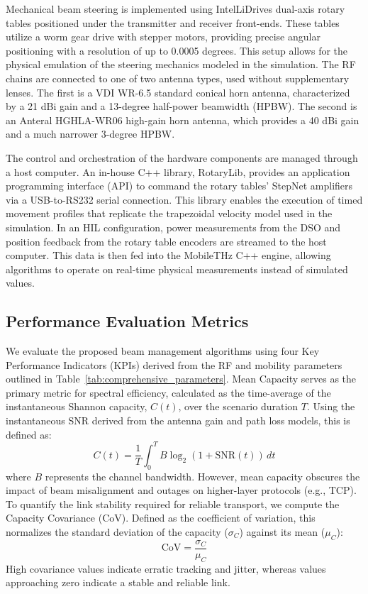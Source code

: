 \documentclass[fleqn,10pt]{wlscirep}
\begin{document}
Mechanical beam steering is implemented using IntelLiDrives dual-axis rotary tables positioned under the transmitter and receiver front-ends. These tables utilize a worm gear drive with stepper motors, providing precise angular positioning with a resolution of up to 0.0005 degrees. This setup allows for the physical emulation of the steering mechanics modeled in the simulation. The RF chains are connected to one of two antenna types, used without supplementary lenses. The first is a VDI WR-6.5 standard conical horn antenna, characterized by a 21 dBi gain and a 13-degree half-power beamwidth (HPBW). The second is an Anteral HGHLA-WR06 high-gain horn antenna, which provides a 40 dBi gain and a much narrower 3-degree HPBW.

The control and orchestration of the hardware components are managed through a host computer. An in-house C++ library, RotaryLib, provides an application programming interface (API) to command the rotary tables' StepNet amplifiers via a USB-to-RS232 serial connection. This library enables the execution of timed movement profiles that replicate the trapezoidal velocity model used in the simulation. In an HIL configuration, power measurements from the DSO and position feedback from the rotary table encoders are streamed to the host computer. This data is then fed into the MobileTHz C++ engine, allowing algorithms to operate on real-time physical measurements instead of simulated values.


\subsection*{Performance Evaluation Metrics}
We evaluate the proposed beam management algorithms using four Key Performance Indicators (KPIs) derived from the RF and mobility parameters outlined in Table~\ref{tab:comprehensive_parameters}. Mean Capacity  serves as the primary metric for spectral efficiency, calculated as the time-average of the instantaneous Shannon capacity, $C(t)$, over the scenario duration $T$. Using the instantaneous SNR derived from the antenna gain and path loss models, this is defined as:
\begin{equation}
    {C(t)} = \frac{1}{T} \int_{0}^{T} B \log_2(1 + \text{SNR}(t)) \, dt
\end{equation}
where $B$ represents the channel bandwidth. However, mean capacity obscures the impact of beam misalignment and outages on higher-layer protocols (e.g., TCP). To quantify the link stability required for reliable transport, we compute the Capacity Covariance (CoV). Defined as the coefficient of variation, this normalizes the standard deviation of the capacity ($\sigma_C$) against its mean ($\mu_C$):
\begin{equation}
    \text{CoV} = \frac{\sigma_C}{\mu_C}
\end{equation}
High covariance values indicate erratic tracking and jitter, whereas values approaching zero indicate a stable and reliable link.
\end{document}
